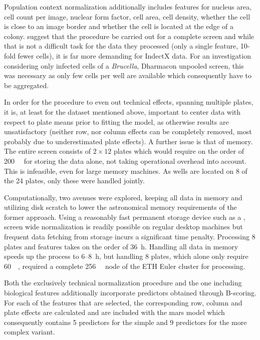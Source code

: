 Population context normalization additionally includes features for nucleus area, cell count per image, nuclear form factor, cell area, cell density, whether the cell is close to an image border and whether the cell is located at the edge of a colony. \citeauthor{Knapp2011} suggest that the procedure be carried out for a complete screen and while that is not a difficult task for the data they processed (only a single feature, 10-fold fewer cells), it is far more demanding for IndectX data. For an investigation considering only infected cells of a \textit{Brucella}, Dharmacon unpooled screen, this was necessary as only few cells per  well are available which consequently have to be aggregated.

In order for the  procedure to even out technical effects, spanning multiple plates, it is, at least for the dataset mentioned above, important to center data with respect to plate means prior to fitting the  model, as otherwise results are unsatisfactory (neither row, nor column effects can be completely removed, most probably due to underestimated plate effects). A further issue is that of memory. The entire screen consists of $2 \times 12$ plates which would require on the order of \SI{200}{\giga\byte} for storing the data alone, not taking operational overhead into account. This is infeasible, even for large memory machines. As  wells are located on 8 of the 24 plates, only these were handled jointly.

Computationally, two avenues were explored, keeping all data in memory and utilizing disk scratch to lower the astronomical memory requirements of the former approach. Using a reasonably fast permanent storage device such as a , screen wide normalization is readily possible on regular desktop machines but frequent data fetching from storage incurs a significant time penalty. Processing 8 plates and  features takes on the order of \SI{36}{\hour}. Handling all data in memory speeds up the process to 6--\SI{8}{\hour}, but handling 8 plates, which alone only require \tilde \SI{60}{\giga\byte}, required a complete \SI{256}{\giga\byte} node of the ETH Euler cluster for processing.

Both the exclusively technical normalization procedure and the one including biological features additionally incorporate predictors obtained through B-scoring. For each of the features that are selected, the corresponding row, column and plate effects are calculated and are included with the mars model which consequently contains 5 predictors for the simple and 9 predictors for the more complex variant.

